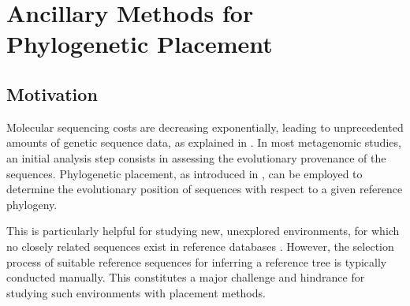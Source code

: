 

\chapter{Ancillary Methods for Phylogenetic Placement}
\label{ch:AutomaticTrees}



\section{Motivation}
\label{ch:AutomaticTrees:sec:Motivation}

Molecular sequencing costs are decreasing exponentially, leading to unprecedented amounts of genetic sequence data,
as explained in .
In most metagenomic studies, an initial analysis step consists in assessing the evolutionary provenance of the sequences.
Phylogenetic placement, as introduced in ,
can be employed to determine the evolutionary position of sequences with respect to a given reference phylogeny.

This is particularly helpful for studying new, unexplored environments,
for which no closely related sequences exist in reference databases \cite{Mahe2017}.
However, the selection process of suitable reference sequences
for inferring a reference tree is typically conducted manually.
This constitutes a major challenge and hindrance for studying such environments with placement methods.


